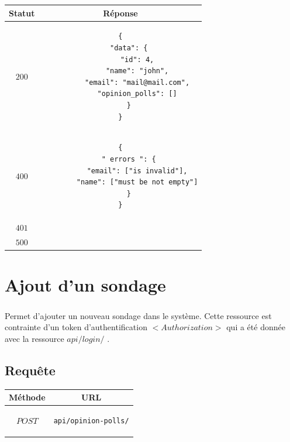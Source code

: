 \documentclass[titlepage]{report}
\begin{document}
\begin{center}
	\begin{tabular}{|c|c|}
		\hline
		Statut & Réponse \\
		\hline
		$ 200 $ & \begin{lstlisting}
{
	"data": {
		"id": 4,
		"name": "john",
		"email": "mail@mail.com",
		"opinion_polls": []
	}
}
		\end{lstlisting} \\ 
		\hline
		$ 400 $ & \begin{lstlisting}
{
	" errors ": {
		"email": ["is invalid"],
		"name": ["must be not empty"]
	}
}
		\end{lstlisting} \\
		\hline
		$ 401 $ & \\
		\hline
		$ 500 $ & \\
		\hline
	\end{tabular}
\end{center}


\chapter{Ajout d'un sondage}

\paragraph{} Permet d’ajouter un nouveau sondage dans le système. Cette ressource est contrainte d’un token d'authentification $<Authorization>$ qui a été donnée avec la ressource $api/login/$ .

\section{Requête}

\begin{center}
	\begin{tabular}{|c|c|}
		\hline
		Méthode & URL \\
		\hline
		$ POST $ 
		&
		\begin{lstlisting}
api/opinion-polls/
		\end{lstlisting} 
		\\ \hline
	\end{tabular}
\end{center}
\end{document}
